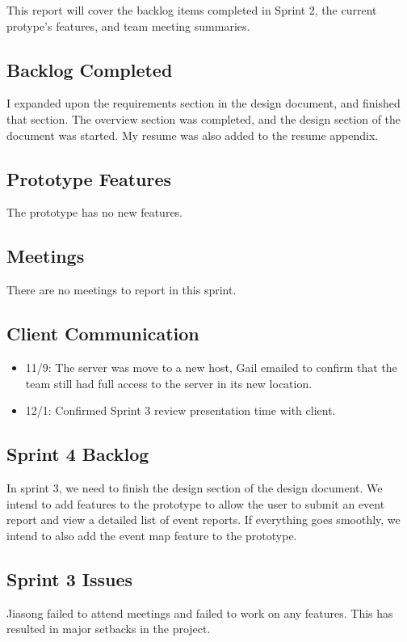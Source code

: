 
This report will cover the backlog items completed in Sprint 2, the current protype's features, and team meeting summaries. 

 \subsection{Backlog Completed}
 I expanded upon the requirements section in the design document, and finished that section. The overview section was completed, and the design section of the document was started. My resume was also added to the resume appendix.
 
 \subsection{Prototype Features}
 The prototype has no new features.
 
 \subsection{Meetings}
There are no meetings to report in this sprint.

\subsection{Client Communication}
\begin{itemize}
\item11/9: The server was move to a new host, Gail emailed to confirm that the team still had full access to the server in its new location.
\item12/1: Confirmed Sprint 3 review presentation time with client.
\end{itemize}

\subsection{Sprint 4 Backlog}
In sprint 3, we need to finish the design section of the design document. We intend to add features to the prototype to allow the user to submit an event report and view a detailed list of event reports. If everything goes smoothly, we intend to also add the event map feature to the prototype.

\subsection{Sprint 3 Issues}
Jiasong failed to attend meetings and failed to work on any features. This has resulted in major setbacks in the project.